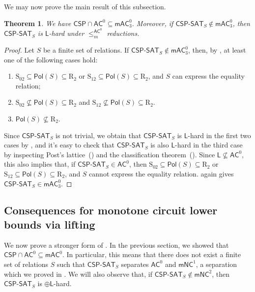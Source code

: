 \documentclass[10pt,a4paper]{article}
\newtheorem{theorem}{Theorem}[section]
\newcommand{\complexityfont}[1]{\mathsf{#1}}
\newcommand{\monclass}[1]{\mathsf{m}#1}
\def\mNC          {\monclass{\NC}}
\def\AC           {\complexityfont{AC}}
\def\pL           {\oplus\complexityfont{L}}
\def\mAC          {\complexityfont{mAC}}
\def\NC           {\complexityfont{NC}}
\renewcommand{\L} {\complexityfont{L}}
\def\sseq{\subseteq}
\newcommand{\CSPf}[1]{\mathsf{CSP}\text{-}\mathsf{SAT}_{#1}}
\newcommand{\CSP}{\mathsf{CSP}}
\newcommand{\Pol}{\mathsf{Pol}}
\newcommand{\acmred}{\leq^{\AC^0}_m\!}
\newcommand{\clonefont}[1]{\mathrm{#1}}
\begin{document}
We may now prove the main result of this subsection.

\begin{theorem}
    \label{thm:ac0-csp}
    We have
    $\CSP \cap \AC^0 \sseq \mAC^0_3$.
    Moreover, if $\CSPf{S} \notin 
    \mAC^0_3$,
    then
    $\CSPf{S}$ is $\L$-hard under $\acmred$ reductions.
\end{theorem}
\begin{proof}
    Let $S$ be a finite set of relations.
    If
    $\CSPf{S} \not\in 
    \mAC^0_3$,
    then,
    by ,
    at least 
    one of the following cases hold:
    \begin{enumerate}
        \item $\clonefont{S_{02}} \sseq \Pol(S) \sseq \clonefont{R_2}$ 
            or 
            $\clonefont{S_{12}} \sseq \Pol(S) \sseq \clonefont{R_2}$,
            and $S$ can express the equality relation;
        \item 
            $\clonefont{S_{02}} \not\sseq \Pol(S) \sseq \clonefont{R_2}$
            and
            $\clonefont{S_{12}} \not \sseq \Pol(S) \sseq \clonefont{R_2}$.
        \item 
            $\Pol(S) \not\sseq \clonefont{R_2}$.
    \end{enumerate}
    Since $\CSPf{S}$ is not trivial,
    we obtain that $\CSPf{S}$ is $\L$-hard 
    in the first two cases
    by
    ,
    and it's easy to check that $\CSPf{S}$ is also
    $\L$-hard in the third case
    by 
    inspecting
    Post's 
    lattice~()
    and the classification theorem~().
    Since $\L \not\sseq \AC^0$,
    this also implies that, if $\CSPf{S} \in \AC^0$,
    then
    $\clonefont{S_{02}} \sseq \Pol(S) \sseq \clonefont{R_2}$
    or
    $\clonefont{S_{12}} \sseq \Pol(S) \sseq \clonefont{R_2}$,
    and $S$ cannot express the equality relation.
    again gives
    $\CSPf{S} \in \mAC^0_3$.
\end{proof}


\subsection{Consequences for monotone circuit lower bounds via lifting}
\label{sec:csp-conseq}

We now prove a stronger form of .
In the previous section, we showed that
$\CSP \cap \AC^0 \sseq \mAC^0$.
In particular, this means that there does not exist a finite set of relations $S$
such that
$\CSPf{S}$ separates $\AC^0$ and $\mNC^1$,
a separation which we proved in .
We will also observe that, if $\CSPf{S} \notin \mNC^2$, then $\CSPf{S}$ is
$\pL$-hard.
\end{document}

